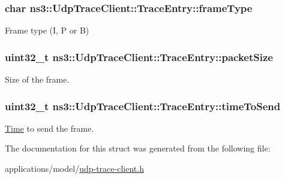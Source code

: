 \subsubsection[{\texorpdfstring{frame\+Type}{frameType}}]{\setlength{\rightskip}{0pt plus 5cm}char ns3\+::\+Udp\+Trace\+Client\+::\+Trace\+Entry\+::frame\+Type}\hypertarget{structns3_1_1UdpTraceClient_1_1TraceEntry_ab858a6d0ee4b240ca12842c3cfebd366}{}\label{structns3_1_1UdpTraceClient_1_1TraceEntry_ab858a6d0ee4b240ca12842c3cfebd366}


Frame type (I, P or B) 

\subsubsection[{\texorpdfstring{packet\+Size}{packetSize}}]{\setlength{\rightskip}{0pt plus 5cm}uint32\+\_\+t ns3\+::\+Udp\+Trace\+Client\+::\+Trace\+Entry\+::packet\+Size}\hypertarget{structns3_1_1UdpTraceClient_1_1TraceEntry_a82474d07bd39e6ee632adbe4834a1761}{}\label{structns3_1_1UdpTraceClient_1_1TraceEntry_a82474d07bd39e6ee632adbe4834a1761}


Size of the frame. 

\subsubsection[{\texorpdfstring{time\+To\+Send}{timeToSend}}]{\setlength{\rightskip}{0pt plus 5cm}uint32\+\_\+t ns3\+::\+Udp\+Trace\+Client\+::\+Trace\+Entry\+::time\+To\+Send}\hypertarget{structns3_1_1UdpTraceClient_1_1TraceEntry_a654ee957fff2e819a3b736b251b3994f}{}\label{structns3_1_1UdpTraceClient_1_1TraceEntry_a654ee957fff2e819a3b736b251b3994f}


\hyperlink{classns3_1_1Time}{Time} to send the frame. 



The documentation for this struct was generated from the following file\+:\begin{DoxyCompactItemize}
\item 
applications/model/\hyperlink{udp-trace-client_8h}{udp-\/trace-\/client.\+h}\end{DoxyCompactItemize}
